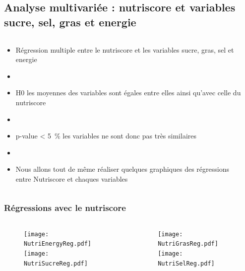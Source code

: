 \subsection{Analyse multivariée : nutriscore et variables sucre, sel, gras et energie}
\begin{frame}{\insertsubsection}
  \begin{columns}
    \begin{column}{.5\textwidth}
      \begin{itemize}
        \item Régression multiple entre le nutriscore et les variables
              sucre, gras, sel et energie
        \item[]
        \item H0 les moyennes des variables sont égales entre elles
              ainsi qu'avec celle du nutriscore
        \item[]
        \item p-value \qty{< 5}{\percent} les variables ne sont donc pas très similaires
        \item[]
        \item Nous allons tout de même réaliser quelques graphiques des régressions
              entre Nutriscore et chaques variables
      \end{itemize}
    \end{column}
    \begin{column}{.5\textwidth}
      \begin{table}
        \tiny
        
      \end{table}
    \end{column}
  \end{columns}
\end{frame}

\subsubsection{Régressions avec le nutriscore}
\begin{frame}{\insertsubsubsection}
  \begin{columns}
    \begin{column}{.5\textwidth}
      \begin{figure}
        \texttt{[image: NutriEnergyReg.pdf]}
        \texttt{[image: NutriSucreReg.pdf]}
      \end{figure}
    \end{column}
    \begin{column}{.5\textwidth}
      \begin{figure}
        \texttt{[image: NutriGrasReg.pdf]}
        \texttt{[image: NutriSelReg.pdf]}
      \end{figure}
    \end{column}
  \end{columns}
\end{frame}

